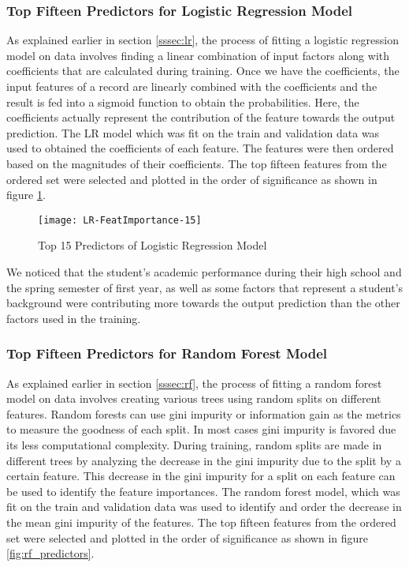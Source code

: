 \documentclass[11pt,openright]{report}
\begin{document}
\subsubsection{Top Fifteen Predictors for Logistic Regression Model}

As explained earlier in section \ref{sssec:lr}, the process of fitting a logistic regression model on data involves finding a linear combination of input factors along with coefficients that are calculated during training. Once we have the coefficients, the input features of a record are linearly combined with the coefficients and the result is fed into a sigmoid function to obtain the probabilities. Here, the coefficients actually represent the contribution of the feature towards the output prediction. The LR model which was fit on the train and validation data was used to obtained the coefficients of each feature. The features were then ordered based on the magnitudes of their coefficients. The top fifteen features from the ordered set were selected and plotted in the order of significance as shown in figure \ref{fig:lr_predictors}.
 \begin{figure}[!ht]
	\centering
	\texttt{[image: LR-FeatImportance-15]}
	\caption{Top 15 Predictors of Logistic Regression Model}
	\label{fig:lr_predictors}
\end{figure} 

We noticed that the student's academic performance during their high school and the spring semester of first year, as well as some factors that represent a student's background were contributing more towards the output prediction than the other factors used in the training.

\subsubsection{Top Fifteen Predictors for Random Forest Model}

As explained earlier in section \ref{sssec:rf}, the process of fitting a random forest model on data involves creating various trees using random splits on different features. Random forests can use gini impurity or information gain as the metrics to measure the goodness of each split. In most cases gini impurity is favored due its less computational complexity. During training, random splits are made in different trees by analyzing the decrease in the gini impurity due to the split by a certain feature. This decrease in the gini impurity for a split on each feature can be used to identify the feature importances. The random forest model, which was fit on the train and validation data was used to identify and order the decrease in the mean gini impurity of the features. The top fifteen features from the ordered set were selected and plotted in the order of significance as shown in figure \ref{fig:rf_predictors}.
\end{document}
